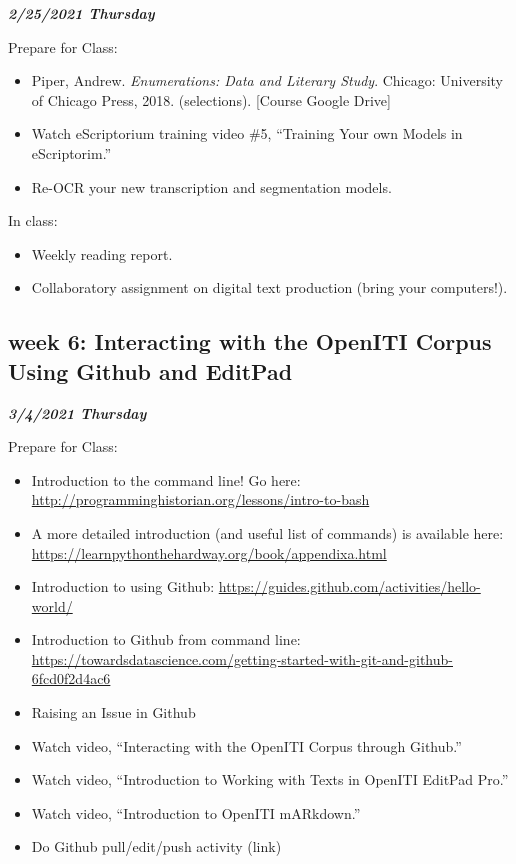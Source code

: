 \documentclass[
]{book}
\providecommand{\tightlist}{%
  \setlength{\itemsep}{0pt}\setlength{\parskip}{0pt}}
\begin{document}
\textbf{\emph{2/25/2021 Thursday}}

Prepare for Class:

\begin{itemize}
\tightlist
\item
  Piper, Andrew. \emph{Enumerations: Data and Literary Study}. Chicago: University of Chicago Press, 2018. (selections). {[}Course Google Drive{]}
\item
  Watch eScriptorium training video \#5, ``Training Your own Models in eScriptorim.''
\item
  Re-OCR your new transcription and segmentation models.
\end{itemize}

In class:

\begin{itemize}
\tightlist
\item
  Weekly reading report.
\item
  Collaboratory assignment on digital text production (bring your computers!).
\end{itemize}

\hypertarget{week-6-interacting-with-the-openiti-corpus-using-github-and-editpad}{%
\subsection{week 6: Interacting with the OpenITI Corpus Using Github and EditPad}\label{week-6-interacting-with-the-openiti-corpus-using-github-and-editpad}}

\textbf{\emph{3/4/2021 Thursday}}

Prepare for Class:

\begin{itemize}
\tightlist
\item
  Introduction to the command line! Go here: \url{http://programminghistorian.org/lessons/intro-to-bash}
\item
  A more detailed introduction (and useful list of commands) is available here: \url{https://learnpythonthehardway.org/book/appendixa.html}
\item
  Introduction to using Github: \url{https://guides.github.com/activities/hello-world/}
\item
  Introduction to Github from command line: \url{https://towardsdatascience.com/getting-started-with-git-and-github-6fcd0f2d4ac6}
\item
  Raising an Issue in Github
\item
  Watch video, ``Interacting with the OpenITI Corpus through Github.''
\item
  Watch video, ``Introduction to Working with Texts in OpenITI EditPad Pro.''
\item
  Watch video, ``Introduction to OpenITI mARkdown.''
\item
  Do Github pull/edit/push activity (link)
\end{itemize}
\end{document}
